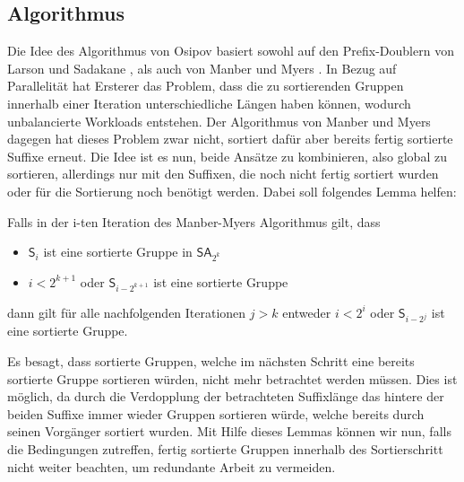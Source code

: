 \subsection{Algorithmus}
Die Idee des Algorithmus von Osipov basiert sowohl auf den Prefix-Doublern von Larson und Sadakane \cite{saca:1}, als auch von Manber und Myers \cite{Manber1993}. In Bezug auf Parallelität hat Ersterer das Problem, dass die zu sortierenden Gruppen innerhalb einer Iteration unterschiedliche Längen haben können, wodurch unbalancierte Workloads entstehen. Der Algorithmus von Manber und Myers dagegen hat dieses Problem zwar nicht, sortiert dafür aber bereits fertig sortierte Suffixe erneut. Die Idee ist es nun, beide Ansätze zu kombinieren, also global zu sortieren, allerdings nur mit den Suffixen, die noch nicht fertig sortiert wurden oder für die Sortierung noch benötigt werden. Dabei soll folgendes Lemma helfen:
\begin{lemma}\label{lem:sort-gruppe}
Falls in der i-ten Iteration des Manber-Myers Algorithmus gilt, dass
\begin{itemize}
\item $\mathsf{S}_i$ ist eine sortierte Gruppe in $\mathsf{SA}_{2^k}$
\item $i < 2^{k+1}$ oder $\mathsf{S}_{i-2^{k+1}}$ ist eine sortierte Gruppe
\end{itemize} 
dann gilt für alle nachfolgenden Iterationen $j>k$ entweder $i<2^i$ oder $\mathsf{S}_{i-2^j}$ ist eine sortierte Gruppe.
\end{lemma}
Es besagt, dass sortierte Gruppen, welche im nächsten Schritt eine bereits sortierte Gruppe sortieren würden, nicht mehr betrachtet werden müssen. Dies ist möglich, da durch die Verdopplung der betrachteten Suffixlänge das hintere der beiden Suffixe immer wieder Gruppen sortieren würde, welche bereits durch seinen Vorgänger sortiert wurden.
Mit Hilfe dieses Lemmas können wir nun, falls die Bedingungen zutreffen, fertig sortierte Gruppen innerhalb des Sortierschritt nicht weiter beachten, um redundante Arbeit zu vermeiden.

